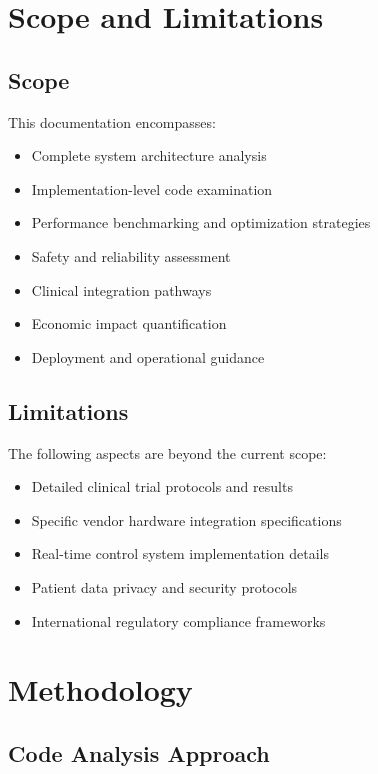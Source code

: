 \section{Scope and Limitations}
\label{sec:scope_limitations}

\subsection{Scope}

This documentation encompasses:

\begin{itemize}
    \item Complete system architecture analysis
    \item Implementation-level code examination
    \item Performance benchmarking and optimization strategies
    \item Safety and reliability assessment
    \item Clinical integration pathways
    \item Economic impact quantification
    \item Deployment and operational guidance
\end{itemize}

\subsection{Limitations}

The following aspects are beyond the current scope:

\begin{itemize}
    \item Detailed clinical trial protocols and results
    \item Specific vendor hardware integration specifications
    \item Real-time control system implementation details
    \item Patient data privacy and security protocols
    \item International regulatory compliance frameworks
\end{itemize}

\section{Methodology}
\label{sec:methodology}

\subsection{Code Analysis Approach}

